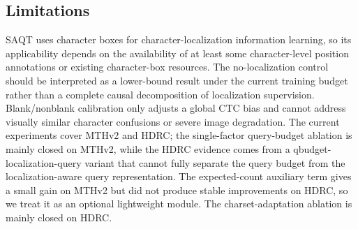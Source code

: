 \subsection{Limitations}

SAQT uses character boxes for character-localization information learning, so its applicability depends on the availability of at least some character-level position annotations or existing character-box resources. The no-localization control should be interpreted as a lower-bound result under the current training budget rather than a complete causal decomposition of localization supervision. Blank/nonblank calibration only adjusts a global CTC bias and cannot address visually similar character confusions or severe image degradation. The current experiments cover MTHv2 and HDRC; the single-factor query-budget ablation is mainly closed on MTHv2, while the HDRC evidence comes from a qbudget-localization-query variant that cannot fully separate the query budget from the localization-aware query representation. The expected-count auxiliary term gives a small gain on MTHv2 but did not produce stable improvements on HDRC, so we treat it as an optional lightweight module. The charset-adaptation ablation is mainly closed on HDRC.

